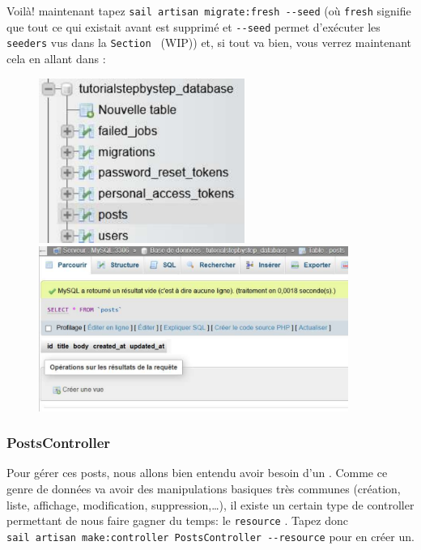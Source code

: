 Voilà! maintenant tapez \verb|sail artisan migrate:fresh --seed| (où \verb|fresh| signifie que tout ce qui existait avant est supprimé et \verb|--seed| permet d'exécuter les \texttt{seeders} vus dans la \texttt{Section~} (WIP)) et, si tout va bien, vous verrez maintenant cela en allant dans \phpmyadmin{}:

\begin{figure}[!h]
    \centering
    \begin{minipage}{0.49\textwidth}
         \centering
         \includegraphics[width=0.6\textwidth]{figures-C1/db_posts_1.pdf}
    \end{minipage}
    \begin{minipage}{0.49\textwidth}
         \centering
         \includegraphics[width=0.9\textwidth]{figures-C1/db_posts_2.pdf}
    \end{minipage}
\end{figure}

\subsubsection[PostsController][laravel.com/docs/12.x/controllers\#resource-controllers]{PostsController}

Pour gérer ces posts, nous allons bien entendu avoir besoin d'un \controller{}. Comme ce genre de données va avoir des manipulations basiques très communes (création, liste, affichage, modification, suppression,\ldots), il existe un certain type de controller permettant de nous faire gagner du temps: le \texttt{resource} \controller{}. Tapez donc \\
\verb|sail artisan make:controller PostsController --resource| pour en créer un.

